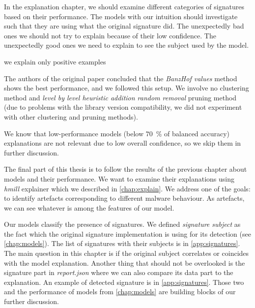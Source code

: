 
In the explanation chapter, we should examine different categories of signatures based on their performance. The models with our intuition should investigate such that they are using what the original signature did. The unexpectedly bad ones we should not try to explain because of their low confidence. The unexpectedly good ones we need to explain to see the subject used by the model.




we explain only positive examples

The authors of the original paper concluded that the \emph{BanzHof values} method shows the best performance, and we followed this setup. We involve no clustering method and \emph{level by level heuristic addition random removal} pruning method (due to problems with the library version compatibility, we did not experiment with other clustering and pruning methods).

We know that low-performance models (below $70$~\% of balanced accuracy) explanations are not relevant due to low overall confidence, so we skip them in further discussion.


The final part of this thesis is to follow the results of the previous chapter about models and their performance. We want to examine their explanations using \emph{hmill} explainer \cite{Pevny2020} which we described in \ref{chap:explain}. We address one of the goals: to identify artefacts corresponding to different malware behaviour. As artefacts, we can see whatever is among the features of our model. 

Our models classify the presence of signatures. We defined \emph{signature subject} as the fact which the original signature implementation is using for its detection (see \ref{chap:models}). The list of signatures with their subjects is in \ref{app:signatures}. The main question in this chapter is if the original subject correlates or coincides with the model explanation. Another thing that should not be overlooked is the signature part in \emph{report.json} where we can also compare its data part to the explanation. An example of detected signature is in \ref{app:signatures}. Those two and the performance of models from \ref{chap:models} are building blocks of our further discussion.

